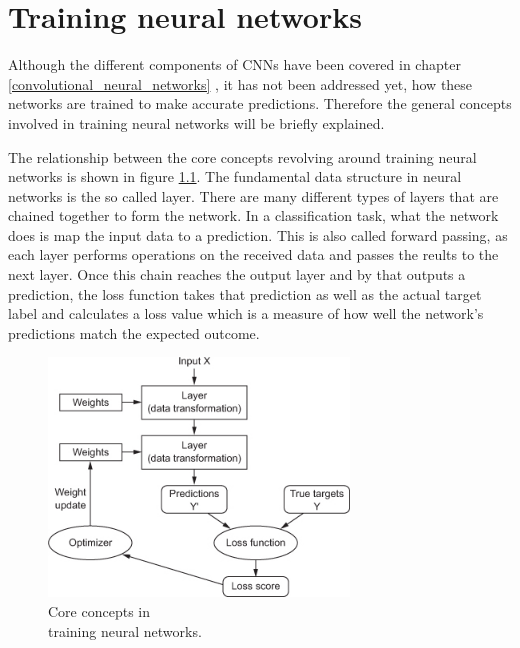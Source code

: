\chapter{Training neural networks}
\label{training_neural_networks}
Although the different components of CNNs have been covered in chapter \ref{convolutional_neural_networks} , it has not been addressed yet, how these networks are trained to make accurate predictions. Therefore the general concepts involved in training neural networks will be briefly explained.  

\begin{minipage}{0.45\textwidth}
	The relationship between the core concepts revolving around training neural networks is shown in figure \ref{fig:nn_comp}. The fundamental data structure in neural networks is the so called layer. There are many different types of layers that are chained together to form the network. In a classification task, what the network does is map the input data to a prediction. This is also called forward passing, as each layer performs operations on the received data and passes the reults to the next layer. Once this chain reaches the output layer and by that outputs a prediction, the loss function takes that prediction as well as the actual target label and calculates a loss value which is a measure of how well the network's predictions match the expected outcome. 
\end{minipage}
\begin{minipage}{0.55\textwidth}
	\begin{figure}[H]
		\centering
		\includegraphics[width=8cm]{images/nn/comp.jpg}
		\caption[Bild kurz]{Core concepts in \\\hspace{0\textwidth}training neural networks.}
		\label{fig:nn_comp}
	\end{figure}
\end{minipage}

